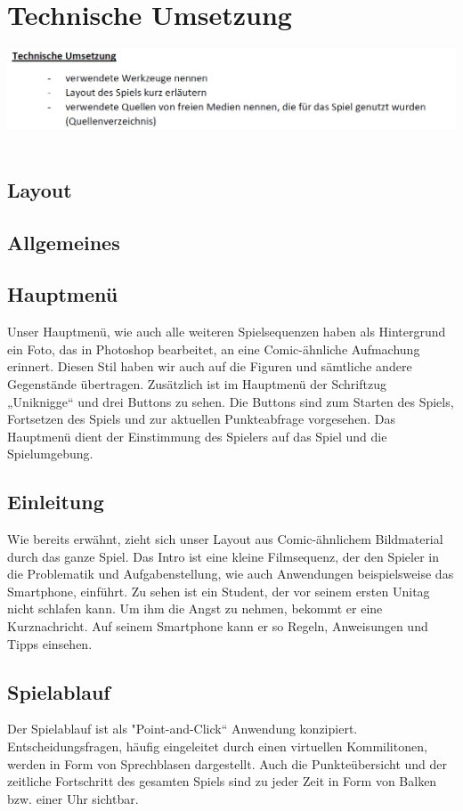 \documentclass[a4paper, 11pt]{article} %
\begin{document}
\section{Technische Umsetzung}
\includegraphics[scale=0.5]{images/umsetzung.png}\\\\
\subsection{Layout}
\subsection{Allgemeines}
\subsection{Hauptmenü}
Unser Hauptmenü, wie auch alle weiteren Spielsequenzen haben als Hintergrund ein Foto, das in Photoshop bearbeitet, an eine Comic-ähnliche Aufmachung erinnert. Diesen Stil haben wir auch auf die Figuren und sämtliche andere Gegenstände übertragen.
Zusätzlich ist im Hauptmenü der Schriftzug „Uniknigge“ und drei Buttons zu sehen. Die Buttons sind zum Starten des Spiels, Fortsetzen des Spiels und zur aktuellen Punkteabfrage vorgesehen. Das Hauptmenü dient der Einstimmung des Spielers auf das Spiel und die Spielumgebung.

\subsection{Einleitung}
Wie bereits erwähnt, zieht sich unser Layout aus Comic-ähnlichem Bildmaterial durch das ganze Spiel. Das Intro ist eine kleine Filmsequenz, der den Spieler in die Problematik und Aufgabenstellung, wie auch Anwendungen beispielsweise das Smartphone, einführt. Zu sehen ist ein Student, der vor seinem ersten Unitag nicht schlafen kann. Um ihm die Angst zu nehmen, bekommt er eine Kurznachricht. Auf seinem Smartphone kann er so Regeln, Anweisungen und Tipps einsehen.

\subsection{Spielablauf}
Der Spielablauf ist als "Point-and-Click“ Anwendung konzipiert. Entscheidungsfragen, häufig eingeleitet durch einen virtuellen Kommilitonen, werden in Form von Sprechblasen dargestellt.
Auch die Punkteübersicht und der zeitliche Fortschritt des gesamten Spiels sind zu jeder Zeit in Form von Balken bzw. einer Uhr sichtbar.
\end{document}
